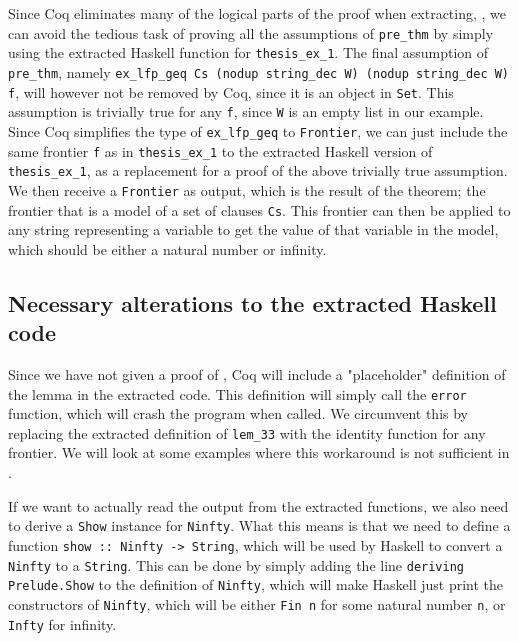 Since Coq eliminates many of the logical parts of the proof when extracting,
\cite[p. ~8]{coqextroverview},
we can avoid the tedious task of proving all the assumptions of \lstinline{pre_thm} by simply
using the extracted Haskell function for \lstinline{thesis_ex_1}.
The final assumption of \lstinline{pre_thm}, namely \lstinline{ex_lfp_geq Cs (nodup string_dec W) (nodup string_dec W) f},
will however not be removed by Coq, since it is an object in \lstinline{Set}.
This assumption is trivially true for any \lstinline{f}, since \lstinline{W} is an empty list in our example.
Since Coq simplifies the type of \lstinline{ex_lfp_geq} to \lstinline{Frontier},
we can just include the same frontier \lstinline{f} as in \lstinline{thesis_ex_1} to the extracted Haskell
version of \lstinline{thesis_ex_1}, as a replacement for a proof of the above trivially true assumption.
We then receive a \lstinline{Frontier} as output, which is the result of the theorem;
the frontier that is a model of a set of clauses \lstinline{Cs}.
This frontier can then be applied to any string representing a variable to get the value of that variable in the model,
which should be either a natural number or infinity.

\subsection{Necessary alterations to the extracted Haskell code}
\label{sec:necessary_alterations}

Since we have not given a proof of , Coq will include a "placeholder" definition of the lemma in the extracted code.
This definition will simply call the \lstinline{error} function, which will crash the program when called.
We circumvent this by replacing the extracted definition of \lstinline{lem_33} with the identity function
for any frontier. We will look at some examples where this workaround is not sufficient in
.

If we want to actually read the output from the extracted functions, we also need to
derive a \lstinline{Show} instance for \lstinline{Ninfty}.
What this means is that we need to define a function \lstinline{show :: Ninfty -> String},
which will be used by Haskell to convert a \lstinline{Ninfty} to a \lstinline{String}.
This can be done by simply adding the line \lstinline{deriving Prelude.Show} to the definition of \lstinline{Ninfty},
which will make Haskell just print the constructors of \lstinline{Ninfty},
which will be either \lstinline{Fin n} for some natural number \lstinline{n},
or \lstinline{Infty} for infinity.

